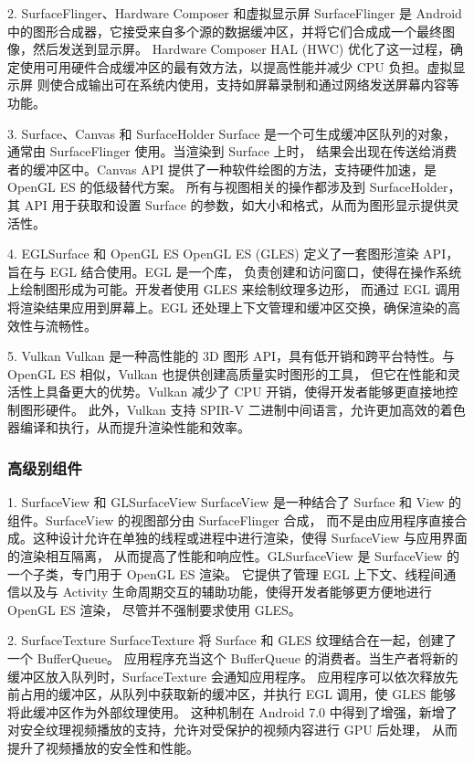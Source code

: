 2. SurfaceFlinger、Hardware Composer 和虚拟显示屏
SurfaceFlinger 是 Android 中的图形合成器，它接受来自多个源的数据缓冲区，并将它们合成成一个最终图像，然后发送到显示屏。
Hardware Composer HAL (HWC) 优化了这一过程，确定使用可用硬件合成缓冲区的最有效方法，以提高性能并减少 CPU 负担。虚拟显示屏 
则使合成输出可在系统内使用，支持如屏幕录制和通过网络发送屏幕内容等功能。

3. Surface、Canvas 和 SurfaceHolder
Surface 是一个可生成缓冲区队列的对象，通常由 SurfaceFlinger 使用。当渲染到 Surface 上时，
结果会出现在传送给消费者的缓冲区中。Canvas API 提供了一种软件绘图的方法，支持硬件加速，是 OpenGL ES 的低级替代方案。
所有与视图相关的操作都涉及到 SurfaceHolder，其 API 用于获取和设置 Surface 的参数，如大小和格式，从而为图形显示提供灵活性。

4. EGLSurface 和 OpenGL ES
OpenGL ES (GLES) 定义了一套图形渲染 API，旨在与 EGL 结合使用。EGL 是一个库，
负责创建和访问窗口，使得在操作系统上绘制图形成为可能。开发者使用 GLES 来绘制纹理多边形，
而通过 EGL 调用将渲染结果应用到屏幕上。EGL 还处理上下文管理和缓冲区交换，确保渲染的高效性与流畅性。

5. Vulkan
Vulkan 是一种高性能的 3D 图形 API，具有低开销和跨平台特性。与 OpenGL ES 相似，Vulkan 也提供创建高质量实时图形的工具，
但它在性能和灵活性上具备更大的优势。Vulkan 减少了 CPU 开销，使得开发者能够更直接地控制图形硬件。
此外，Vulkan 支持 SPIR-V 二进制中间语言，允许更加高效的着色器编译和执行，从而提升渲染性能和效率。

\subsubsection{高级别组件}

1. SurfaceView 和 GLSurfaceView
SurfaceView 是一种结合了 Surface 和 View 的组件。SurfaceView 的视图部分由 SurfaceFlinger 合成，
而不是由应用程序直接合成。这种设计允许在单独的线程或进程中进行渲染，使得 SurfaceView 与应用界面的渲染相互隔离，
从而提高了性能和响应性。GLSurfaceView 是 SurfaceView 的一个子类，专门用于 OpenGL ES 渲染。
它提供了管理 EGL 上下文、线程间通信以及与 Activity 生命周期交互的辅助功能，使得开发者能够更方便地进行 OpenGL ES 渲染，
尽管并不强制要求使用 GLES。

2. SurfaceTexture
SurfaceTexture 将 Surface 和 GLES 纹理结合在一起，创建了一个 BufferQueue。
应用程序充当这个 BufferQueue 的消费者。当生产者将新的缓冲区放入队列时，SurfaceTexture 会通知应用程序。
应用程序可以依次释放先前占用的缓冲区，从队列中获取新的缓冲区，并执行 EGL 调用，使 GLES 能够将此缓冲区作为外部纹理使用。
这种机制在 Android 7.0 中得到了增强，新增了对安全纹理视频播放的支持，允许对受保护的视频内容进行 GPU 后处理，
从而提升了视频播放的安全性和性能。

